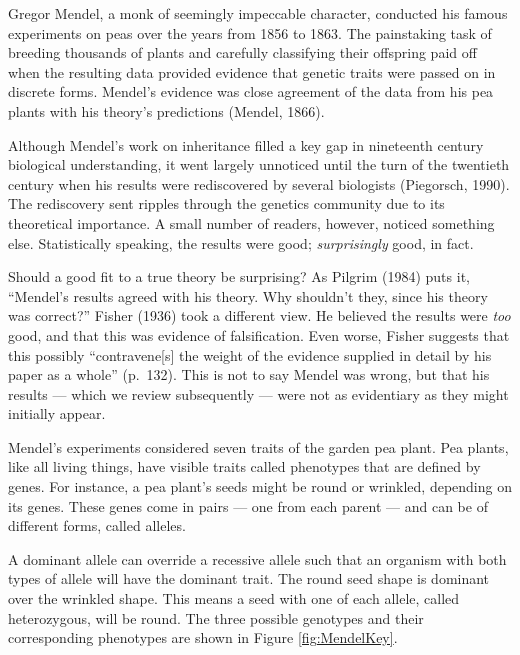 \documentclass[english,floatsintext,man]{apa6}
\theoremstyle{definition}
\theoremstyle{definition}
\theoremstyle{definition}
\theoremstyle{remark}
\begin{document}
Gregor Mendel, a monk of seemingly impeccable character, conducted his
famous experiments on peas over the years from 1856 to 1863. The
painstaking task of breeding thousands of plants and carefully
classifying their offspring paid off when the resulting data provided
evidence that genetic traits were passed on in discrete forms. Mendel's
evidence was close agreement of the data from his pea plants with his
theory's predictions (Mendel, 1866).

Although Mendel's work on inheritance filled a key gap in nineteenth
century biological understanding, it went largely unnoticed until the
turn of the twentieth century when his results were rediscovered by
several biologists (Piegorsch, 1990). The rediscovery sent ripples
through the genetics community due to its theoretical importance. A
small number of readers, however, noticed something else. Statistically
speaking, the results were good; \emph{surprisingly} good, in fact.

Should a good fit to a true theory be surprising? As Pilgrim (1984) puts
it, \enquote{Mendel's results agreed with his theory. Why shouldn't
they, since his theory was correct?} Fisher (1936) took a different
view. He believed the results were \emph{too} good, and that this was
evidence of falsification. Even worse, Fisher suggests that this
possibly \enquote{contravene{[}s{]} the weight of the evidence supplied
in detail by his paper as a whole} (p.~132). This is not to say Mendel
was wrong, but that his results --- which we review subsequently ---
were not as evidentiary as they might initially appear.

Mendel's experiments considered seven traits of the garden pea plant.
Pea plants, like all living things, have visible traits called
phenotypes that are defined by genes. For instance, a pea plant's seeds
might be round or wrinkled, depending on its genes. These genes come in
pairs --- one from each parent --- and can be of different forms, called
alleles.

A dominant allele can override a recessive allele such that an organism
with both types of allele will have the dominant trait. The round seed
shape is dominant over the wrinkled shape. This means a seed with one of
each allele, called heterozygous, will be round. The three possible
genotypes and their corresponding phenotypes are shown in Figure
\ref{fig:MendelKey}.
\end{document}
